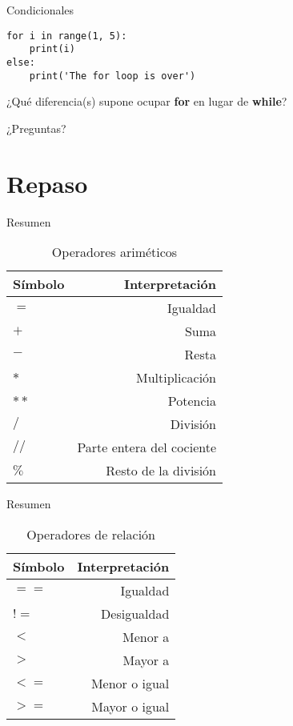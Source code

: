 \documentclass[10pt]{beamer}
\begin{document}
\begin{frame}[fragile]{Condicionales}
\begin{verbatim}
for i in range(1, 5):
	print(i)
else:
	print('The for loop is over')
\end{verbatim}

\begin{center}
	¿Qué diferencia(s) supone ocupar \textbf{for} en lugar de \textbf{while}?  
\end{center}
\end{frame}

\begin{frame}[standout]
	¿Preguntas?
\end{frame}

\section{Repaso}
\begin{frame}{Resumen}
	\begin{table}
		\caption{Operadores ariméticos}
		\begin{tabular}{lr}
			\toprule
			Símbolo&Interpretación\\
			\midrule
		$=$ &Igualdad\\
		$+$ &Suma\\
		$-$ &Resta\\
		$*$ &Multiplicación\\
		$**$&Potencia\\
		$/$ &División\\
		$//$&Parte entera del cociente\\
		$\%$&Resto de la división\\
			\bottomrule
		\end{tabular}
	\end{table}
\end{frame}

\begin{frame}{Resumen}
	\begin{table}
		\caption{Operadores de relación}
		\begin{tabular}{lr}
			\toprule
			Símbolo&Interpretación\\
			\midrule
			$==$ &Igualdad\\
			$!=$&Desigualdad\\
			$<$ &Menor a\\
			$>$ &Mayor a\\
			$<=$ &Menor o igual\\
			$>=$ &Mayor o igual\\
			\bottomrule
		\end{tabular}
	\end{table}
\end{frame}
\end{document}
